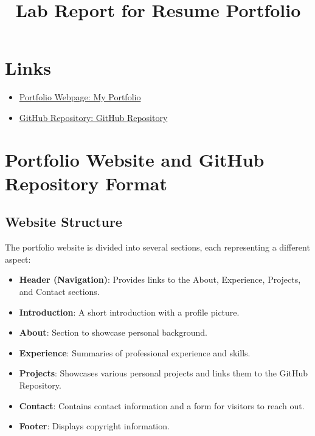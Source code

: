 \documentclass{article}
\title{Lab Report for Resume Portfolio}
\author{}
\date{}
\begin{document}
\maketitle

\section*{Links}
\begin{itemize}
    \item \href{https://ether101.github.io/}{Portfolio Webpage: My Portfolio}
    \item \href{https://github.com/Ether101}{GitHub Repository: GitHub Repository}
\end{itemize}

\section*{Portfolio Website and GitHub Repository Format}

\subsection*{Website Structure}
The portfolio website is divided into several sections, each representing a different aspect:
\begin{itemize}
    \item \textbf{Header (Navigation)}: Provides links to the About, Experience, Projects, and Contact sections.
    \item \textbf{Introduction}: A short introduction with a profile picture.
    \item \textbf{About}: Section to showcase personal background.
    \item \textbf{Experience}: Summaries of professional experience and skills.
    \item \textbf{Projects}: Showcases various personal projects and links them to the GitHub Repository.
    \item \textbf{Contact}: Contains contact information and a form for visitors to reach out.
    \item \textbf{Footer}: Displays copyright information.
\end{itemize}
\end{document}
